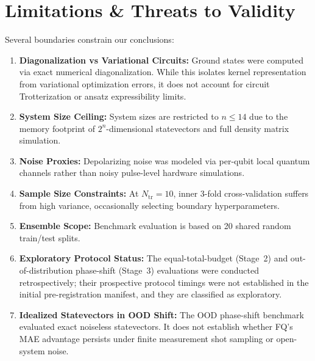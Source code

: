 \documentclass[conference]{IEEEtran}
\begin{document}


\section{Limitations \& Threats to Validity}
Several boundaries constrain our conclusions:
\begin{enumerate}
    \item \textbf{Diagonalization vs Variational Circuits:} Ground states were computed via exact numerical diagonalization. While this isolates kernel representation from variational optimization errors, it does not account for circuit Trotterization or ansatz expressibility limits.
    \item \textbf{System Size Ceiling:} System sizes are restricted to $n \le 14$ due to the memory footprint of $2^n$-dimensional statevectors and full density matrix simulation.
    \item \textbf{Noise Proxies:} Depolarizing noise was modeled via per-qubit local quantum channels rather than noisy pulse-level hardware simulations.
    \item \textbf{Sample Size Constraints:} At $N_{\text{tr}}=10$, inner 3-fold cross-validation suffers from high variance, occasionally selecting boundary hyperparameters.
    \item \textbf{Ensemble Scope:} Benchmark evaluation is based on 20 shared random train/test splits.
    \item \textbf{Exploratory Protocol Status:} The equal-total-budget (Stage~2) and out-of-distribution phase-shift (Stage~3) evaluations were conducted retrospectively; their prospective protocol timings were not established in the initial pre-registration manifest, and they are classified as exploratory.
    \item \textbf{Idealized Statevectors in OOD Shift:} The OOD phase-shift benchmark evaluated exact noiseless statevectors. It does not establish whether FQ's MAE advantage persists under finite measurement shot sampling or open-system noise.
\end{enumerate}
\end{document}
